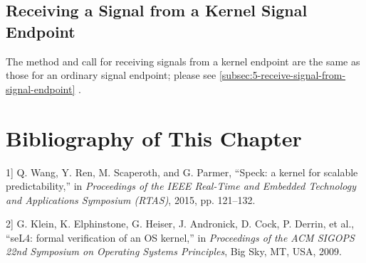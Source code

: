 \subsection{Receiving a Signal from a Kernel Signal Endpoint}\label{subsec:6-receive-signal-from-kernel-signal-endpoint}

The method and call for receiving signals from a kernel endpoint are the same as those for an ordinary signal endpoint; please see \ref{subsec:5-receive-signal-from-signal-endpoint}
.

\section{Bibliography of This Chapter}\label{sec:6-chapter-bibliography}

\protect{}\label{cite:6-1}

\noindent {[}1{]} Q. Wang, Y. Ren, M. Scaperoth, and G. Parmer, ``Speck: a kernel for scalable predictability,'' in \textit{Proceedings of the IEEE Real-Time and Embedded Technology and Applications Symposium (RTAS)}, 2015, pp. 121--132.

\protect{}\label{cite:6-2}

\noindent {[}2{]} G. Klein, K. Elphinstone, G. Heiser, J. Andronick, D. Cock, P. Derrin, et al., ``seL4: formal verification of an OS kernel,'' in \textit{Proceedings of the ACM SIGOPS 22nd Symposium on Operating Systems Principles}, Big Sky, MT, USA, 2009.

